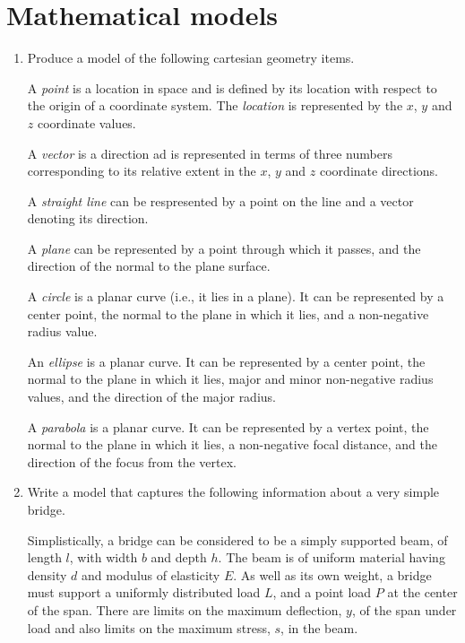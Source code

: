 \documentclass{article}
\newenvironment{exercises}{\begin{enumerate}}{\end{enumerate}}
\begin{document}
\clearpage
\section{Mathematical models}

\begin{exercises}

\item Produce a model of the following cartesian geometry items.
  
    A \emph{point} is a location in space and is defined by its location
with respect to the origin of a coordinate system. The \emph{location}
is represented by the $x$, $y$ and $z$ coordinate values.

    A \emph{vector} is a direction ad is represented in terms of three numbers
corresponding to its relative extent in the $x$, $y$ and $z$ coordinate 
directions.

    A \emph{straight line} can be respresented by a point on the line
and a vector denoting its direction.

    A \emph{plane} can be represented by a point through which it passes, 
and the direction of the normal to the plane surface.

    A \emph{circle} is a planar curve (i.e., it lies in a plane). It can be
represented by a center point, the normal to the plane in which it lies,
and a non-negative radius value.

    An \emph{ellipse} is a planar curve. It can be
represented by a center point, the normal to the plane in which it lies,
major and minor non-negative radius values, and the direction of the major
radius.

    A \emph{parabola} is a planar curve. It can be
represented by a vertex point, the normal to the plane in which it lies,
a non-negative focal distance, and the direction of the focus from
the vertex.

\item Write a model that captures the following information about
      a very simple bridge.

    Simplistically, a bridge can be considered to be a simply supported beam, of
    length $l$, with width $b$ and depth $h$. The beam is of uniform material
    having density $d$ and modulus of elasticity $E$.
    As well as its own weight, a bridge must support a 
    uniformly distributed load $L$, and a point load $P$ at the center of the
    span. There are limits on the maximum deflection, $y$, of the span under load
    and also limits on the maximum stress, $s$, in the beam.


\end{exercises}
\end{document}
